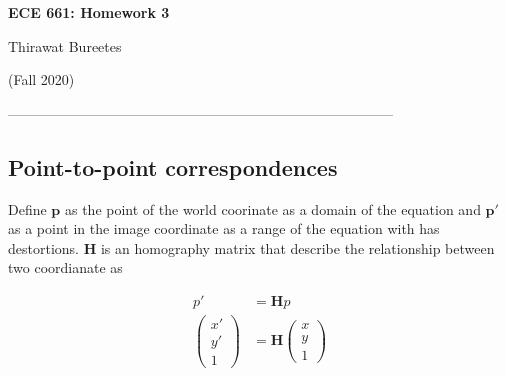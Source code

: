 \documentclass[11pt]{article}
\begin{document}
\begin{center}
\Large{\textbf{ECE 661: Homework 3}}

Thirawat Bureetes

(Fall 2020)
\end{center}
	
 
-----------------------------------------------------------------------------------

\subsection*{Point-to-point correspondences}

Define $\mathbf{p}$ as the point of the world coorinate as a domain of the equation and $\mathbf{p'}$ as a point in the image coordinate as a range of the equation with has destortions. $\mathbf{H}$ is an homography matrix that describe the relationship between two coordianate as 


\begin{align*}
p' &= \mathbf{H} p \\
\begin{pmatrix} x'\\ y'\\ 1\end{pmatrix} &= 
\mathbf{H} 
\begin{pmatrix} x\\ y\\ 1\end{pmatrix}
\end{align*}
\end{document}
